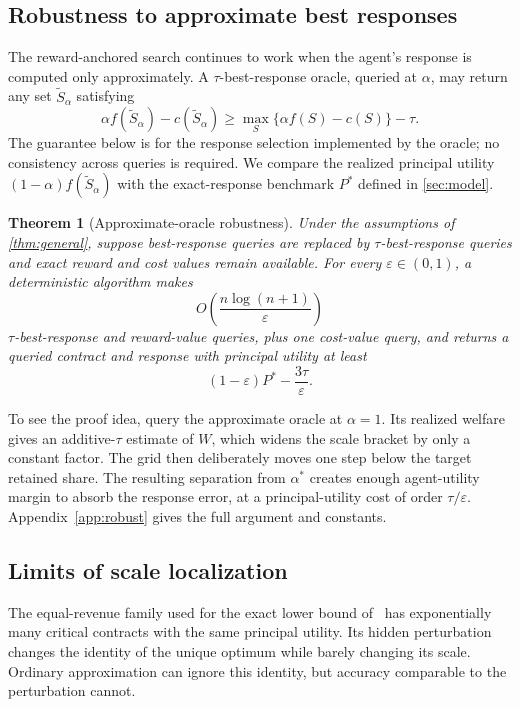 \documentclass[11pt]{article}
\newtheorem{theorem}{Theorem}
\newcommand{\eps}{\varepsilon}
\begin{document}
\subsection{Robustness to approximate best responses}\label{sec:robust}

The reward-anchored search continues to work when the agent's response is
computed only approximately.  A
$\tau$-best-response oracle, queried at $\alpha$, may return any set
$\widetilde S_\alpha$ satisfying
\[
\alpha f(\widetilde S_\alpha)-c(\widetilde S_\alpha)
\geq
\max_S\{\alpha f(S)-c(S)\}-\tau.
\]
The guarantee below is for the response selection implemented by the oracle;
no consistency across queries is required.  We compare the realized principal
utility $(1-\alpha)f(\widetilde S_\alpha)$ with the exact-response benchmark
$P^*$ defined in \cref{sec:model}.

\begin{theorem}[Approximate-oracle robustness]\label{thm:robust}
Under the assumptions of \cref{thm:general}, suppose best-response queries
are replaced by $\tau$-best-response queries and exact reward and cost
values remain available.  For every $\eps\in(0,1)$, a deterministic
algorithm makes
\[
O\!\left(\frac{n\log(n+1)}{\eps}\right)
\]
$\tau$-best-response and reward-value queries, plus one cost-value query, and
returns a queried contract and response with principal utility at least
\[
                         (1-\eps)P^*-\frac{3\tau}{\eps}.
\]
\end{theorem}

To see the proof idea, query the approximate oracle at $\alpha=1$.  Its
realized welfare gives an additive-$\tau$ estimate of $W$, which widens the
scale bracket by only a constant factor.  The grid then deliberately moves
one step below the target retained share.  The resulting separation from
$\alpha^*$ creates enough agent-utility margin to absorb the response error,
at a principal-utility cost of order $\tau/\eps$.  Appendix~\ref{app:robust}
gives the full argument and constants.

\subsection{Limits of scale localization}\label{sec:limits}

The equal-revenue family used for the exact lower bound
of~\cite{DFGR26} has exponentially many critical contracts with the same
principal utility.  Its hidden perturbation changes the identity of the
unique optimum while barely changing its scale.  Ordinary approximation can
ignore this identity, but accuracy comparable to the perturbation cannot.
\end{document}
